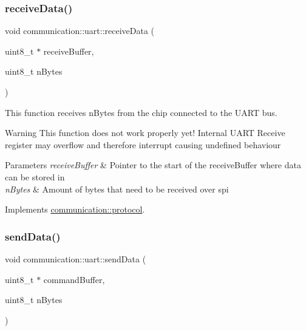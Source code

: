 \subsubsection{\texorpdfstring{receive\+Data()}{receiveData()}}
{\footnotesize\ttfamily void communication\+::uart\+::receive\+Data (\begin{DoxyParamCaption}\item[{uint8\+\_\+t $\ast$}]{receive\+Buffer,  }\item[{uint8\+\_\+t}]{n\+Bytes }\end{DoxyParamCaption})\hspace{0.3cm}{\ttfamily [virtual]}}



This function receives n\+Bytes from the chip connected to the U\+A\+RT bus. 

\begin{DoxyWarning}{Warning}
This function does not work properly yet! Internal U\+A\+RT Receive register may overflow and therefore interrupt causing undefined behaviour
\end{DoxyWarning}

\begin{DoxyParams}{Parameters}
{\em receive\+Buffer} & Pointer to the start of the receive\+Buffer where data can be stored in \\
\hline
{\em n\+Bytes} & Amount of bytes that need to be received over spi \\
\hline
\end{DoxyParams}


Implements \hyperlink{classcommunication_1_1protocol_ad0d43530ae3db2b14a6e9c1f77aa530a}{communication\+::protocol}.

\mbox{\label{classcommunication_1_1uart_a915087d1f825171d705801de0981b151}} 
\subsubsection{\texorpdfstring{send\+Data()}{sendData()}}
{\footnotesize\ttfamily void communication\+::uart\+::send\+Data (\begin{DoxyParamCaption}\item[{uint8\+\_\+t $\ast$}]{command\+Buffer,  }\item[{uint8\+\_\+t}]{n\+Bytes }\end{DoxyParamCaption})\hspace{0.3cm}{\ttfamily [virtual]}}



